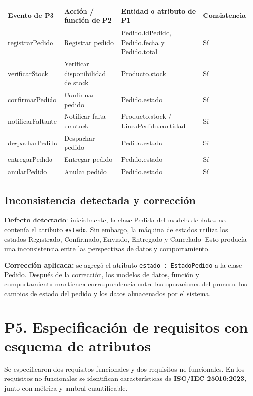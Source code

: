 \documentclass[12pt,a4paper]{article}
\begin{document}
\begin{center}
\renewcommand{\arraystretch}{1.25}
\small
\begin{tabularx}{\textwidth}{|p{2.7cm}|p{3.6cm}|X|p{2.25cm}|}
\hline
\rowcolor{uteqblue}\color{white}\textbf{Evento de P3} & \color{white}\textbf{Acción / función de P2} & \color{white}\textbf{Entidad o atributo de P1} & \color{white}\textbf{Consistencia} \\
\hline
registrarPedido & Registrar pedido & Pedido.idPedido, Pedido.fecha y Pedido.total & Sí \\
\hline
verificarStock & Verificar disponibilidad de stock & Producto.stock & Sí \\
\hline
confirmarPedido & Confirmar pedido & Pedido.estado & Sí \\
\hline
notificarFaltante & Notificar falta de stock & Producto.stock / LineaPedido.cantidad & Sí \\
\hline
despacharPedido & Despachar pedido & Pedido.estado & Sí \\
\hline
entregarPedido & Entregar pedido & Pedido.estado & Sí \\
\hline
anularPedido & Anular pedido & Pedido.estado & Sí \\
\hline
\end{tabularx}
\end{center}

\subsection*{Inconsistencia detectada y corrección}
\textbf{Defecto detectado:} inicialmente, la clase Pedido del modelo de datos no contenía el atributo \texttt{estado}. Sin embargo, la máquina de estados utiliza los estados Registrado, Confirmado, Enviado, Entregado y Cancelado. Esto producía una inconsistencia entre las perspectivas de datos y comportamiento.

\textbf{Corrección aplicada:} se agregó el atributo \texttt{estado : EstadoPedido} a la clase Pedido. Después de la corrección, los modelos de datos, función y comportamiento mantienen correspondencia entre las operaciones del proceso, los cambios de estado del pedido y los datos almacenados por el sistema.

\section{P5. Especificación de requisitos con esquema de atributos}
Se especificaron dos requisitos funcionales y dos requisitos no funcionales. En los requisitos no funcionales se identifican características de \textbf{ISO/IEC 25010:2023}, junto con métrica y umbral cuantificable.
\end{document}
